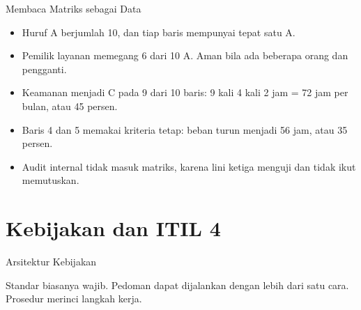\documentclass[aspectratio=169, table, 12pt]{beamer}
\begin{document}
\begin{frame}{{\Large Membaca Matriks sebagai Data}}
  \vspace{6pt}
  \small
  \begin{itemize}
    \item Huruf A berjumlah 10, dan tiap baris mempunyai tepat satu A.
    \item Pemilik layanan memegang 6 dari 10 A. Aman bila ada beberapa orang dan pengganti.
    \item Keamanan menjadi C pada 9 dari 10 baris: 9 kali 4 kali 2 jam = 72 jam per bulan, atau 45
          persen.
    \item Baris 4 dan 5 memakai kriteria tetap: beban turun menjadi 56 jam, atau 35 persen.
    \item Audit internal tidak masuk matriks, karena lini ketiga menguji dan tidak ikut memutuskan.
  \end{itemize}
\end{frame}

\section{Kebijakan dan ITIL 4}

\begin{frame}{{\Large Arsitektur Kebijakan}}
  \begin{center}
    \resizebox{!}{0.62\textheight}{}
  \end{center}
  \small Standar biasanya wajib. Pedoman dapat dijalankan dengan lebih dari satu cara. Prosedur
  merinci langkah kerja.
\end{frame}
\end{document}
